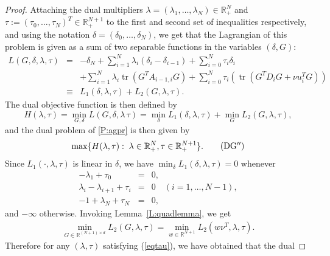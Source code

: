 \documentclass[12pt]{article}
\numberwithin{equation}{section}
\theoremstyle{definition}
\theoremstyle{remark}
\DeclareMathOperator{\trace}{tr}
\def\real{\mathbb{R}}
\begin{document}
\begin{proof}
Attaching the dual multipliers $\lambda=(\lambda_1,\dots,\lambda_N) \in \real^N_{+}$ and
$\tau:=(\tau_0, \ldots ,\tau_N)^T \in \real^{N+1}_{+}$ to the first and second set of
inequalities respectively, and using the notation $\delta=(\delta_0, \ldots ,\delta_N)$, we
get that the Lagrangian of this problem is given as a sum of two separable functions in the
variables $(\delta, G)$:
\begin{eqnarray*}
    L(G,\delta, \lambda, \tau)&=&
         -\delta_N+\sum_{i=1}^{N} \lambda_i(\delta_i - \delta_{i-1}) + \sum_{i=0}^N \tau_i \delta_i \\
         & &+ \sum_{i=1}^{N} \lambda_i \trace(G^T A_{i-1,i} G)+ \sum_{i=0}^N \tau_i
        \left( \trace(G^T D_i G+ \nu u_i^T G) \right)\\
        & \equiv & L_1(\delta, \lambda, \tau)+ L_2(G,\lambda, \tau).
\end{eqnarray*}
The dual objective function is then defined by $$H(\lambda, \tau)=\min_{G, \delta} L(G,\delta,
\lambda\, \tau)=\min_\delta L_1(\delta, \lambda, \tau)+ \min_{G} L_2(G, \lambda, \tau),$$ and
the dual problem of \eqref{P:agpr} is then given by
\begin{align*}
    \begin{aligned}
        \max \{ H(\lambda, \tau):\; \lambda \in\real^{N}_{+}, \tau \in \real^{N+1}_{+}\}.
    \end{aligned}
    \tag{DG$^{\prime\prime}$}\label{P:dualagpr}
\end{align*}
Since $L_1(\cdot,\lambda, \tau)$ is linear in $\delta$, we have $\min_\delta
L_1(\delta,\lambda, \tau) =0$ whenever
\begin{eqnarray}
            -\lambda_1 +\tau_0 &= & 0, \nonumber\\
            \lambda_i-\lambda_{i+1}+\tau_i &=& 0\quad (i=1,\dots,N-1), \label{eqtau}\\
             -1+\lambda_N+\tau_N &=& 0, \nonumber
            \end{eqnarray}
            and $-\infty$ otherwise. Invoking Lemma~\ref{L:quadlemma}, we get
\begin{align*}
     \min_{G\in\mathbb{R}^{(N+1)\times d}} L_2(G,\lambda, \tau) =
     \min_{w\in\mathbb{R}^{N+1}} L_2(w \nu^T,\lambda, \tau).
\end{align*}
Therefore for any $(\lambda,\tau)$ satisfying (\ref{eqtau}), we have obtained that the dual

\end{proof}
\end{document}
